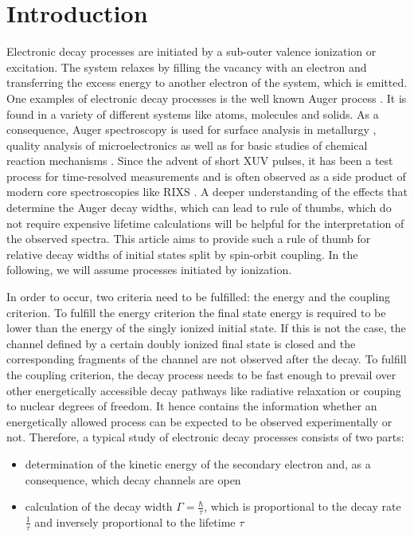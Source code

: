 \section{Introduction}
Electronic decay processes are initiated by a sub-outer valence ionization
or excitation. The system relaxes by filling the vacancy with an electron and
transferring the excess energy to another electron of the system, which is emitted.
One examples of electronic decay processes is the
well known Auger process \cite{Meitner22,Auger23}.
It is found in a variety of different systems like atoms, molecules and solids.
As a consequence, Auger spectroscopy
is used for surface analysis in metallurgy \cite{},
quality analysis of microelectronics \cite{}
as well as for basic studies of chemical reaction mechanisms \cite{}.
Since the advent of short XUV pulses, it has been a test process for
time-resolved measurements \cite{}
and is often observed as a side product of modern core spectroscopies like
RIXS \cite{}.
A deeper understanding of the effects that determine the Auger decay widths, which
can lead to rule of thumbs, which do not require expensive lifetime
calculations will
be helpful for the interpretation of the observed spectra.
This article aims to provide such a rule of thumb for relative decay widths
of initial states split by spin-orbit coupling.
In the following, we will assume processes initiated by ionization.

In order to occur, two criteria need to be fulfilled: the energy and the coupling
criterion.
To fulfill the energy criterion the final state energy is required
to be lower than
the energy of the singly ionized initial state. If this is not the case, the
channel defined by a certain doubly ionized final state
is closed and the corresponding fragments of the
channel are not observed after the decay.
To fulfill the coupling criterion, the decay process needs to be fast enough
to prevail over other energetically accessible decay pathways like radiative
relaxation or couping to nuclear degrees of freedom.
It hence contains
the information whether an energetically allowed process can be expected
to be observed experimentally or not.
Therefore, a typical study of electronic decay processes consists of two parts:
\begin{itemize}
 \item determination of the kinetic energy of the secondary electron
       and, as a consequence, which decay channels are open
 \item calculation of the decay width $\Gamma=\frac{\hbar}{\tau}$, which
       is proportional to the decay rate $\frac{1}{\tau}$ and
       inversely proportional to the lifetime $\tau$
\end{itemize}


